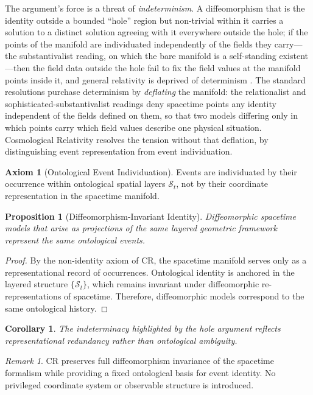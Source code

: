 \documentclass[11pt,a4paper]{article}
\theoremstyle{plain}
\newtheorem{corollary}{Corollary}
\newtheorem{proposition}{Proposition}
\theoremstyle{definition}
\newtheorem{axiom}{Axiom}
\theoremstyle{remark}
\newtheorem{remark}{Remark}
\begin{document}
The argument's force is a threat of \emph{indeterminism}. A diffeomorphism that is the identity outside a bounded ``hole'' region but non-trivial within it carries a solution to a distinct solution agreeing with it everywhere outside the hole; if the points of the manifold are individuated independently of the fields they carry---the substantivalist reading, on which the bare manifold is a self-standing existent---then the field data outside the hole fail to fix the field values at the manifold points inside it, and general relativity is deprived of determinism \cite{EarmanNorton1987}. The standard resolutions purchase determinism by \emph{deflating} the manifold: the relationalist and sophisticated-substantivalist readings deny spacetime points any identity independent of the fields defined on them, so that two models differing only in which points carry which field values describe one physical situation. Cosmological Relativity resolves the tension without that deflation, by distinguishing event representation from event individuation.

\begin{axiom}[Ontological Event Individuation]
Events are individuated by their occurrence within ontological spatial layers $\mathcal{S}_t$, not by their coordinate representation in the spacetime manifold.
\end{axiom}

\begin{proposition}[Diffeomorphism-Invariant Identity]
Diffeomorphic spacetime models that arise as projections of the same layered geometric framework represent the same ontological events.
\end{proposition}

\begin{proof}
By the non-identity axiom of CR, the spacetime manifold serves only as a representational record of occurrences. Ontological identity is anchored in the layered structure $\{\mathcal{S}_t\}$, which remains invariant under diffeomorphic re-representations of spacetime. Therefore, diffeomorphic models correspond to the same ontological history.
\end{proof}

\begin{corollary}
The indeterminacy highlighted by the hole argument reflects representational redundancy rather than ontological ambiguity.
\end{corollary}

\begin{remark}
CR preserves full diffeomorphism invariance of the spacetime formalism while providing a fixed ontological basis for event identity. No privileged coordinate system or observable structure is introduced.
\end{remark}
\end{document}
